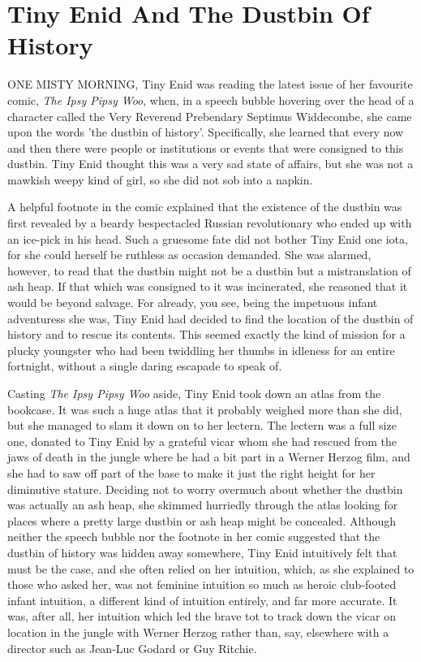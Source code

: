 \chapter{Tiny Enid And The Dustbin Of History}

ONE MISTY MORNING, Tiny Enid was reading the latest issue of her favourite comic, \emph{The Ipsy Pipsy Woo}, when, in a speech bubble hovering over the head of a character called the Very Reverend Prebendary Septimus Widdecombe, she came upon the words 'the dustbin of history'. Specifically, she learned that every now and then there were people or institutions or events that were consigned to this dustbin. Tiny Enid thought this was a very sad state of affairs, but she was not a mawkish weepy kind of girl, so she did not sob into a napkin.

A helpful footnote in the comic explained that the existence of the dustbin was first revealed by a beardy bespectacled Russian revolutionary who ended up with an ice-pick in his head. Such a gruesome fate did not bother Tiny Enid one iota, for she could herself be ruthless as occasion demanded. She was alarmed, however, to read that the dustbin might not be a dustbin but a mistranslation of ash heap. If that which was consigned to it was incinerated, she reasoned that it would be beyond salvage. For already, you see, being the impetuous infant adventuress she was, Tiny Enid had decided to find the location of the dustbin of history and to rescue its contents. This seemed exactly the kind of mission for a plucky youngster who had been twiddling her thumbs in idleness for an entire fortnight, without a single daring escapade to speak of.

Casting \emph{The Ipsy Pipsy Woo} aside, Tiny Enid took down an atlas from the bookcase. It was such a huge atlas that it probably weighed more than she did, but she managed to slam it down on to her lectern. The lectern was a full size one, donated to Tiny Enid by a grateful vicar whom she had rescued from the jaws of death in the jungle where he had a bit part in a Werner Herzog film, and she had to saw off part of the base to make it just the right height for her diminutive stature. Deciding not to worry overmuch about whether the dustbin was actually an ash heap, she skimmed hurriedly through the atlas looking for places where a pretty large dustbin or ash heap might be concealed. Although neither the speech bubble nor the footnote in her comic suggested that the dustbin of history was hidden away somewhere, Tiny Enid intuitively felt that must be the case, and she often relied on her intuition, which, as she explained to those who asked her, was not feminine intuition so much as heroic club-footed infant intuition, a different kind of intuition entirely, and far more accurate. It was, after all, her intuition which led the brave tot to track down the vicar on location in the jungle with Werner Herzog rather than, say, elsewhere with a director such as Jean-Luc Godard or Guy Ritchie.

